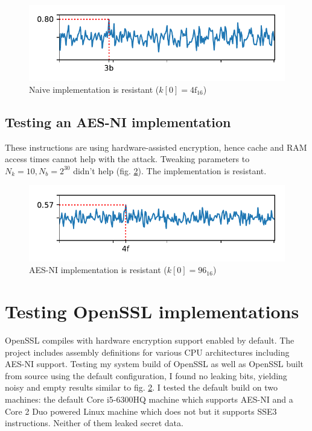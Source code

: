 \documentclass[thesis=B,english]{FITthesis}[2019/03/06]
\begin{document}
\begin{figure}
	\centering
	\includegraphics{sbox_example.pdf}
	\caption{Naive implementation is resistant ($k[0] = \text{4f}_{16}$)}
	\label{fig:sbox_noleak}
\end{figure}

\subsection{Testing an AES-NI implementation}
These instructions are using hardware-assisted encryption, hence cache and RAM access times cannot help with the attack.
Tweaking parameters to $N_k = 10, N_b = 2^{30}$ didn't help (fig. \ref{fig:aesni_noleak}).
The implementation is resistant.

\begin{figure}
	\centering
	\includegraphics{ni_example.pdf}
	\caption{AES-NI implementation is resistant ($k[0] = \text{96}_{16}$)}
	\label{fig:aesni_noleak}
\end{figure}

\section{Testing OpenSSL implementations}
\label{section:testing_openssl}
OpenSSL compiles with hardware encryption support enabled by default. The project includes assembly definitions for various CPU architectures including AES-NI support.
Testing my system build of OpenSSL as well as OpenSSL built from source using the default configuration, I found no leaking bits, yielding noisy and empty results similar to fig. \ref{fig:aesni_noleak}.
I tested the default build on two machines: the default Core i5-6300HQ machine which supports AES-NI and a Core 2 Duo powered Linux machine which does not but it supports SSE3 instructions.
Neither of them leaked secret data.
\end{document}
